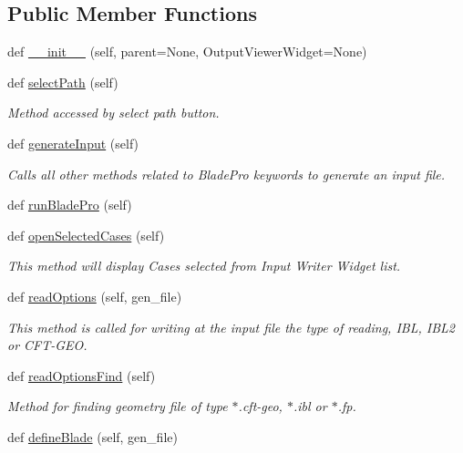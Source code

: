 \subsection*{Public Member Functions}
\begin{DoxyCompactItemize}
\item 
def \hyperlink{a00070_a8b9718669dac6016ebe4e4f27421c7f2}{\+\_\+\+\_\+init\+\_\+\+\_\+} (self, parent=None, Output\+Viewer\+Widget=None)
\item 
def \hyperlink{a00070_a15eb2b878a78d644c96b19a5785d5428}{select\+Path} (self)
\begin{DoxyCompactList}\small\item\em Method accessed by select path button. \end{DoxyCompactList}\item 
def \hyperlink{a00070_a6ec74acbc44de3023188ddd8395b5b30}{generate\+Input} (self)
\begin{DoxyCompactList}\small\item\em Calls all other methods related to Blade\+Pro keywords to generate an input file. \end{DoxyCompactList}\item 
def \hyperlink{a00070_a4f95b1c85e601bde79e5d4e1a526ef8b}{run\+Blade\+Pro} (self)
\item 
def \hyperlink{a00070_af311095fe10adcca5237385033dfe67b}{open\+Selected\+Cases} (self)
\begin{DoxyCompactList}\small\item\em This method will display Cases selected from Input Writer Widget list. \end{DoxyCompactList}\item 
def \hyperlink{a00070_a7f4b3856d4dc973878dcbfd7697018bb}{read\+Options} (self, gen\+\_\+file)
\begin{DoxyCompactList}\small\item\em This method is called for writing at the input file the type of reading, I\+BL, I\+B\+L2 or C\+F\+T-\/\+G\+EO. \end{DoxyCompactList}\item 
def \hyperlink{a00070_a3b0f9f0d1af5015219f258ad0751c778}{read\+Options\+Find} (self)
\begin{DoxyCompactList}\small\item\em Method for finding geometry file of type $\ast$.cft-\/geo, $\ast$.ibl or $\ast$.fp. \end{DoxyCompactList}\item 
def \hyperlink{a00070_abf54bdb00a2743fb488463ab7247b146}{define\+Blade} (self, gen\+\_\+file)

\end{DoxyCompactItemize}
